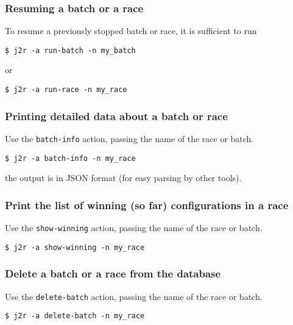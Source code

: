 \documentclass[11pt,notitlepage,twoside,a4paper]{article}
\begin{document}
\subsubsection{Resuming a batch or a race}

To resume a previously stopped batch or race, it is sufficient to run

\begin{lstlisting}
$ j2r -a run-batch -n my_batch
\end{lstlisting}

\noindent
or

\begin{lstlisting}
$ j2r -a run-race -n my_race
\end{lstlisting}

\subsubsection{Printing detailed data about a batch or race}

Use the \texttt{batch-info} action, passing the name of the race or
batch.

\begin{lstlisting}
$ j2r -a batch-info -n my_race
\end{lstlisting}

\noindent
the output is in JSON format (for easy parsing by other tools).

\subsubsection{Print the list of winning (so far) configurations in a race}

Use the \texttt{show-winning} action, passing the name of the race or
batch.

\begin{lstlisting}
$ j2r -a show-winning -n my_race
\end{lstlisting}

\subsubsection{Delete a batch or a race from the database}

Use the \texttt{delete-batch} action, passing the name of the race or
batch.

\begin{lstlisting}
$ j2r -a delete-batch -n my_race
\end{lstlisting}
\end{document}
